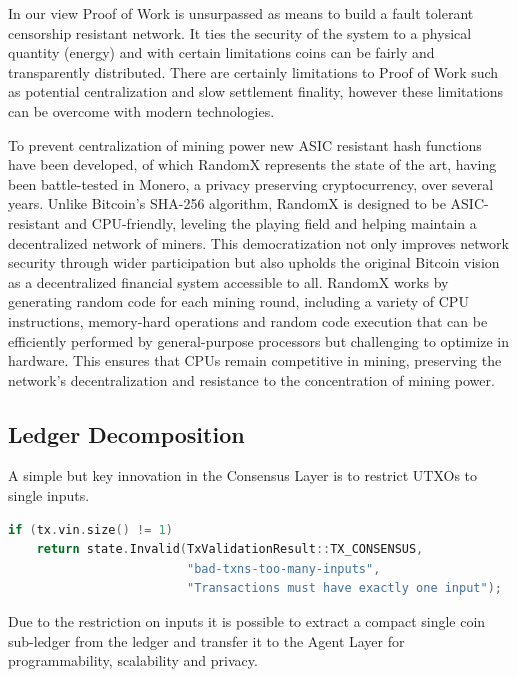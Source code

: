 \documentclass{article}
\begin{document}
In our view Proof of Work is unsurpassed as means to build a fault tolerant censorship resistant network. It ties the security of the system to a physical quantity (energy) and with certain limitations coins can be fairly and transparently distributed. There are certainly limitations to Proof of Work such as potential centralization and slow settlement finality, however these limitations can be overcome with modern technologies.

To prevent centralization of mining power new ASIC resistant hash functions have been developed, of which RandomX represents the state of the art, having been battle-tested in Monero, a privacy preserving cryptocurrency, over several years. Unlike Bitcoin's SHA-256 algorithm, RandomX is designed to be ASIC-resistant and CPU-friendly, leveling the playing field and helping maintain a decentralized network of miners. This democratization not only improves network security through wider participation but also upholds the original Bitcoin vision as a decentralized financial system accessible to all. RandomX works by generating random code for each mining round, including a variety of CPU instructions, memory-hard operations and random code execution that can be efficiently performed by general-purpose processors but challenging to optimize in hardware. This ensures that CPUs remain competitive in mining, preserving the network's decentralization and resistance to the concentration of mining power.

\subsection{Ledger Decomposition}

A simple but key innovation in the Consensus Layer is to restrict UTXOs to single inputs.

\begin{minipage}{\linewidth}
\begin{lstlisting}[language=C++]
if (tx.vin.size() != 1)
    return state.Invalid(TxValidationResult::TX_CONSENSUS,
                         "bad-txns-too-many-inputs",
                         "Transactions must have exactly one input");
\end{lstlisting}
\end{minipage}

Due to the restriction on inputs it is possible to extract a compact single coin sub-ledger from the ledger and transfer it to the Agent Layer for programmability, scalability and privacy.
\end{document}
